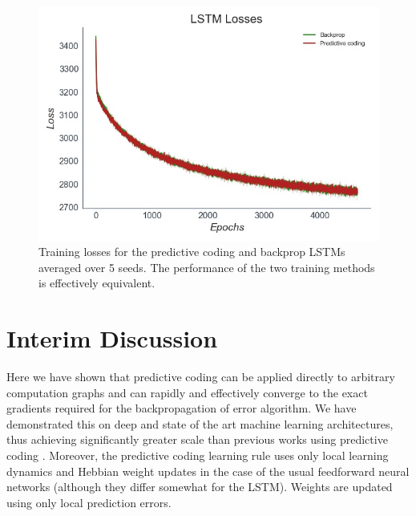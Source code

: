 \begin{figure}[ht]
  \centering
  \includegraphics[width=0.7\linewidth]{chapter_6_figures/LSTM_Losses_super_prelim_6.jpg}  
\caption{Training losses for the predictive coding and backprop LSTMs averaged over 5 seeds. The performance of the two training methods is effectively equivalent.}
\label{pcbp_lstm_losses}
\end{figure}

\section{Interim Discussion}

Here we have shown that predictive coding can be applied directly to arbitrary computation graphs and can rapidly and effectively converge to the exact gradients required for the backpropagation of error algorithm. We have demonstrated this on deep and state of the art machine learning architectures, thus achieving significantly greater scale than previous works using predictive coding \citep{millidge2019implementing,orchard2019making,whittington2017approximation}. Moreover, the predictive coding learning rule uses only local learning dynamics and Hebbian weight updates in the case of the usual feedforward neural networks (although they differ somewhat for the LSTM). Weights are updated using only local prediction errors. 

